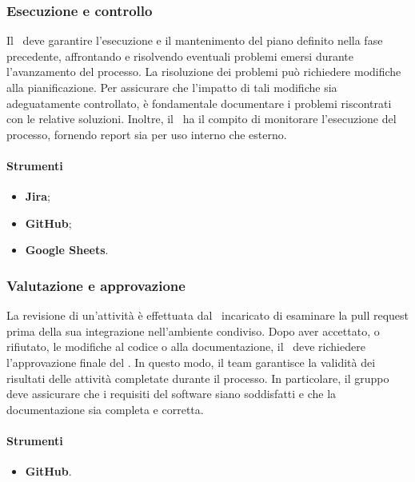 \subsubsection{Esecuzione e controllo}
\par Il \Responsabile\ deve garantire l'esecuzione e il mantenimento del piano definito nella fase precedente, affrontando e risolvendo eventuali problemi emersi durante l'avanzamento del processo. La risoluzione dei problemi può richiedere modifiche alla pianificazione. Per assicurare che l'impatto di tali modifiche sia adeguatamente controllato, è fondamentale documentare i problemi riscontrati con le relative soluzioni. Inoltre, il \Responsabile\ ha il compito di monitorare l'esecuzione del processo, fornendo report sia per uso interno che esterno.

\paragraph*{Strumenti}
\IntroStrumenti
\begin{itemize}
  \item \textbf{Jira};
  \item \textbf{GitHub};
  \item \textbf{Google Sheets}.
\end{itemize}

\subsubsection{Valutazione e approvazione}
\par La revisione di un'attività è effettuata dal \Verificatore\ incaricato di esaminare la pull request prima della sua integrazione nell'ambiente condiviso. Dopo aver accettato, o rifiutato, le modifiche al codice o alla documentazione, il \Verificatore\ deve richiedere l'approvazione finale del \Responsabile. In questo modo, il team garantisce la validità dei risultati delle attività completate durante il processo. In particolare, il gruppo deve assicurare che i requisiti del software siano soddisfatti e che la documentazione sia completa e corretta.

\paragraph*{Strumenti}
\begin{itemize}
  \item \textbf{GitHub}.
\end{itemize}

